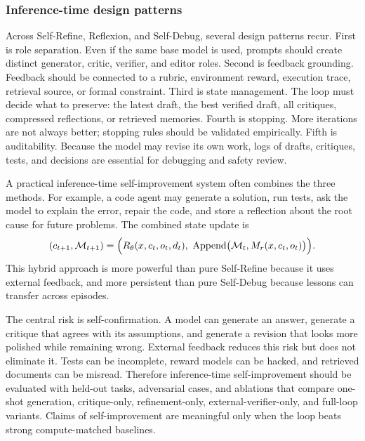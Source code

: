 \subsubsection{Inference-time design patterns}
\label{subsubsec:inference-patterns}

Across Self-Refine, Reflexion, and Self-Debug, several design patterns recur. First is role separation. Even if the same base model is used, prompts should create distinct generator, critic, verifier, and editor roles. Second is feedback grounding. Feedback should be connected to a rubric, environment reward, execution trace, retrieval source, or formal constraint. Third is state management. The loop must decide what to preserve: the latest draft, the best verified draft, all critiques, compressed reflections, or retrieved memories. Fourth is stopping. More iterations are not always better; stopping rules should be validated empirically. Fifth is auditability. Because the model may revise its own work, logs of drafts, critiques, tests, and decisions are essential for debugging and safety review.

A practical inference-time self-improvement system often combines the three methods. For example, a code agent may generate a solution, run tests, ask the model to explain the error, repair the code, and store a reflection about the root cause for future problems. The combined state update is
\begin{equation}
    (c_{t+1},\mathcal{M}_{t+1})=
    \Bigl(R_\theta(x,c_t,o_t,d_t),\ \operatorname{Append}\bigl(\mathcal{M}_t, M_r(x,c_t,o_t)\bigr)\Bigr).
\end{equation}
This hybrid approach is more powerful than pure Self-Refine because it uses external feedback, and more persistent than pure Self-Debug because lessons can transfer across episodes.

The central risk is self-confirmation. A model can generate an answer, generate a critique that agrees with its assumptions, and generate a revision that looks more polished while remaining wrong. External feedback reduces this risk but does not eliminate it. Tests can be incomplete, reward models can be hacked, and retrieved documents can be misread. Therefore inference-time self-improvement should be evaluated with held-out tasks, adversarial cases, and ablations that compare one-shot generation, critique-only, refinement-only, external-verifier-only, and full-loop variants. Claims of self-improvement are meaningful only when the loop beats strong compute-matched baselines.

